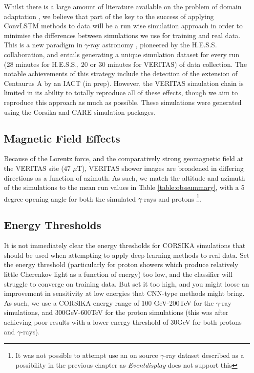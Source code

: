 Whilst there is a large amount of literature available on the problem of domain adaptation \cite{ada}, we believe that part of the key to the success of applying ConvLSTM methods to data will be a run wise simulation approach in order to minimise the differences between simulations we use for training and real data. This is a new paradigm in $\gamma$-ray astronomy \cite{rws}, pioneered by the H.E.S.S. collaboration, and entails generating a unique simulation dataset for every run (28 minutes for H.E.S.S., 20 or 30 minutes for VERITAS) of data collection. The notable achievements of this strategy include the detection of the extension of Centaurus A by an IACT (in prep). However, the VERITAS simulation chain is limited in its ability to totally reproduce all of these effects, though we aim to reproduce this approach as much as possible. These simulations were generated using the Corsika and CARE \cite{CARE} simulation packages.

\subsection{Magnetic Field Effects}
Because of the Lorentz force, and the comparatively strong geomagnetic field at the VERITAS site \cite{kraus} (47 $\mu$T), VERITAS shower images are broadened in differing directions as a function of azimuth. As such, we match the altitude and azimuth of the simulations to the mean run values in Table \ref{table:obssummary}, with a 5 degree opening angle for both the simulated $\gamma$-rays and protons \footnote{It was not possible to attempt use an on source $\gamma$-ray dataset described as a possibility in the previous chapter as \textit{Eventdisplay} does not support this}.
\subsection{Energy Thresholds}
It is not immediately clear the energy thresholds for CORSIKA simulations that should be used when attempting to apply deep learning methods to real data. Set the energy threshold (particularly for proton showers which produce relatively little Cherenkov light as a function of energy) too low, and the classifier will struggle to converge on training data. But set it too high, and you might loose an improvement in sensitivity at low energies that CNN-type methods might bring. As such, we use a CORSIKA energy range of 100 GeV-200TeV for the $\gamma$-ray simulations, and 300GeV-600TeV for the proton simulations (this was after achieving poor results with a lower energy threshold of 30GeV for both protons and $\gamma$-rays).

